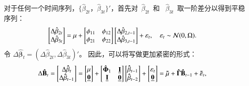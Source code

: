 对于任何一个时间序列，$\{\hat{\beta}_{2t}，\hat{\beta}_{3t}\}'$，首先对~$\hat{\beta}_{2t}$~和~ $\hat{\beta}_{3t}$~取一阶差分以得到平稳序列：
  \begin{align}\label{var3}
    \begin{bmatrix}
      \Delta \hat{\beta}_{2t} \\
      \Delta \hat{\beta}_{3t} \\
    \end{bmatrix}
    & =
    \mathbf{\mu} + 
    \begin{bmatrix}
     \phi_{11} & \phi_{12} \\
     \phi_{21} & \phi_{22} \\
    \end{bmatrix}
       \begin{bmatrix}
      \Delta  \hat{\beta}_{2,t-1} \\
      \Delta \hat{\beta}_{3,t-1}\\
    \end{bmatrix}+ \mathbf{\varepsilon}_t, \quad \mathbf{\varepsilon}_t\sim \mathcal{N}(0,\Omega).
  \end{align}
令 $\Delta\mathbf{\hat{\beta}}_t=(\Delta\hat{\beta}_{2t},\Delta\hat{\beta}_{3t})'$。
   因此，可以将写做更加紧密的形式：
    \begin{align}\label{var5}
  \Delta\mathbf{\hat{B}}_t &=
    \begin{bmatrix}
      \Delta\mathbf{\hat{\beta}}_t \\ \Delta\mathbf{\hat{\beta}}_{t-1}
    \end{bmatrix}
    = \begin{bmatrix}
      \mathbf{\mu} \\ \mathbf{\underline{0}}
    \end{bmatrix}
    + \begin{bmatrix}
      \mathbf{\hat{\Phi}}_1 & \mathbf{\underline{I}} \\ \mathbf{\underline{I}} & \mathbf{\underline{0}}
    \end{bmatrix}
    \begin{bmatrix}
      \mathbf{\hat{\beta}}_{t-1} \\ \mathbf{\hat{\beta}}_{t-2}
    \end{bmatrix}
    + \begin{bmatrix}
      \mathbf{\varepsilon}_t \\ \mathbf{\underline{0}}
    \end{bmatrix}
    = \mathbf{\tilde{\mu}}  +\mathbf{\hat{\Gamma}} \mathbf{\hat{B}}_{t-1} + \mathbf{\tilde{\varepsilon}}_t,
  \end{align}
